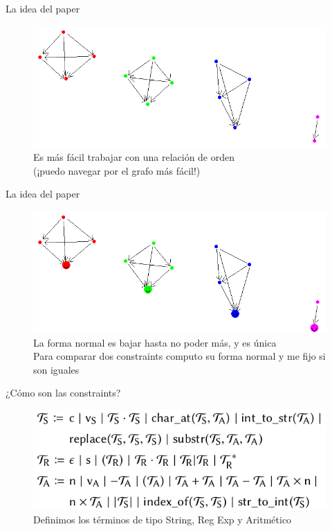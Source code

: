 \documentclass[10pt]{beamer}
\begin{document}
\begin{frame}{La idea del paper}
\begin{figure}[H]
\centering
    \includegraphics[scale=0.6]{plot3.png}
    \captionsetup{labelformat=empty}
    \caption{Es más fácil trabajar con una relación de orden\\(¡puedo navegar por el grafo más fácil!)}
\end{figure}
\end{frame}

\begin{frame}{La idea del paper}
\begin{figure}[H]
\centering
    \includegraphics[scale=0.6]{plot4.png}
    \captionsetup{labelformat=empty}
    \caption{La forma normal es bajar hasta no poder más, y es única\\Para comparar dos constraints computo su forma normal y me fijo si son iguales}
\end{figure}
\end{frame}


\begin{frame}{¿Cómo son las constraints?}


\begin{figure}[H]
\centering
    \includegraphics[scale=0.6]{figure2.png}
    \captionsetup{labelformat=empty}
    \caption{Definimos los términos de tipo String, Reg Exp y Aritmético}
\end{figure}
\end{frame}
\end{document}
